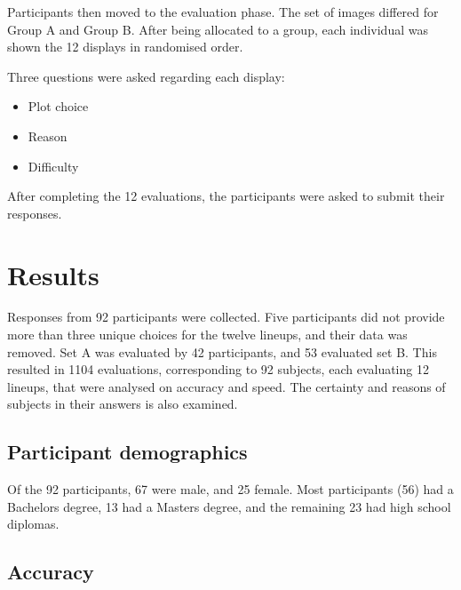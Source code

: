 \documentclass[conference,final,]{IEEEtran}
\providecommand{\tightlist}{%
  \setlength{\itemsep}{0pt}\setlength{\parskip}{0pt}}
\begin{document}
Participants then moved to the evaluation phase.
The set of images differed for Group A and Group B.
After being allocated to a group, each individual was shown the 12 displays in randomised order.

Three questions were asked regarding each display:

\begin{itemize}
\tightlist
\item
  Plot choice
\item
  Reason
\item
  Difficulty
\end{itemize}

After completing the 12 evaluations, the participants were asked to submit their responses.

\hypertarget{results}{%
\section{Results}\label{results}}

Responses from 92 participants were collected. Five participants did not provide more than three unique choices for the twelve lineups, and their data was removed. Set A was evaluated by 42 participants, and 53 evaluated set B. This resulted in 1104 evaluations, corresponding to 92 subjects, each evaluating 12 lineups, that were analysed on accuracy and speed. The certainty and reasons of subjects in their answers is also examined.

\hypertarget{participant-demographics}{%
\subsection{Participant demographics}\label{participant-demographics}}

Of the 92 participants, 67 were male, and 25 female. Most participants (56) had a Bachelors degree, 13 had a Masters degree, and the remaining 23 had high school diplomas.

\hypertarget{accuracy}{%
\subsection{Accuracy}\label{accuracy}}
\end{document}
